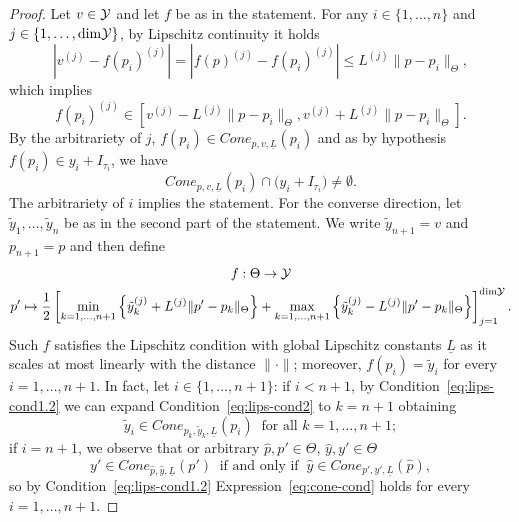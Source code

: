 \begin{proof}
    Let $v\in \mathcal Y$ and let $f$ be as in the statement.
    For any $i\in \{1, \dots, n\}$ and $j \in \{1, \dots, \text{dim}\mathcal Y\}$, by Lipschitz continuity it holds 
    \[
    | v^{(j)} - f(p_i)^{(j)} | = | f(p)^{(j)} - f(p_i)^{(j)} | \leq L^{(j)} \|p-p_i\|_\Theta, 
    \] 
    which implies \[
        f(p_i)^{(j)} \in \left[ v^{(j)} - L^{(j)} \|p-p_i\|_\Theta, v^{(j)} + L^{(j)} \|p-p_i\|_\Theta \right].
    \]
    By the arbitrariety of $j$, $f(p_i) \in Cone_{p,v,\underline L}(p_i) $ and as by hypothesis $f(p_i) \in y_i + I_{\tau_i}$, we have \[
    Cone_{p,v,\underline L}(p_i) \cap  \big ( y_i + I_{\tau_i} \big ) \neq \emptyset.
    \] 
    The arbitrariety of $i$ implies the statement. \newline
    For the converse direction, let $\tilde y_1, \dots, \tilde y_n$ be as in the second part of the statement.
    We write $\tilde y_{n+1} = v$ and $p_{n+1} = p$ and then define
    \begin{equation}\label{eq:lips-interp}
        \begin{gathered}
            f:\Theta \rightarrow \mathcal Y \\
            p' \mapsto \frac{1}{2} \left[\min_{k=1,\dots,n+1} \left\{ \tilde y_k^{(j)} + L^{(j)} \| p' - p_k \|_\Theta \right\}+ \max_{k=1,\dots,n+1} \left\{ \tilde y_k^{(j)} - L^{(j)} \| p' - p_k \|_\Theta \right\} \right]_{j=1}^{\text{dim} \mathcal Y}.
        \end{gathered}
    \end{equation}
    Such $f$ satisfies the Lipschitz condition with global Lipschitz constants $\underline L$ as it scales at most linearly with the distance $\| \cdot \|$; moreover, $f(p_i) = \tilde y_i$ for every $i = 1, \dots, n+1$.
    In fact, let $i \in \{ 1, \dots, n+1\}$: if $i<n+1$, by Condition~\eqref{eq:lips-cond1.2} we can expand Condition~\eqref{eq:lips-cond2} to $k=n+1$ obtaining
    \begin{equation}\label{eq:cone-cond}
        \tilde y_i \in Cone_{p_k, \tilde y_k,\underline L}(p_i) \ \text{ for all } k = 1, \dots, n+1;
    \end{equation}
    if $i= n+1$, we observe that or arbitrary $\hat p,p' \in \Theta$, $\hat y,y'\in \Theta$ \[
        y' \in Cone_{\hat p, \hat y, \underline L}(p') \ \text{ if and only if } \ \hat y \in Cone_{p', y', \underline L}(\hat p),
    \]
    so by Condition~\eqref{eq:lips-cond1.2} Expression~\eqref{eq:cone-cond} holds for every $i=1, \dots, n+1$. \newline

\end{proof}
